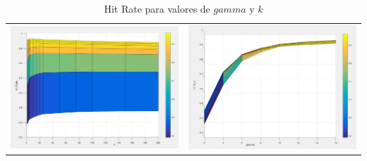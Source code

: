 \begin{table}[h!]
\begin{center}
\begin{tabular}{c c}
	\includegraphics[scale=0.3]{exp2/PLS-HitRate-2.png} &
	\includegraphics[scale=0.3]{exp2/PLS-HitRate-3.png}\\
\end{tabular}
\end{center}
\caption{Hit Rate para valores de $gamma$ y $k$}
\end{table}

\newpage


